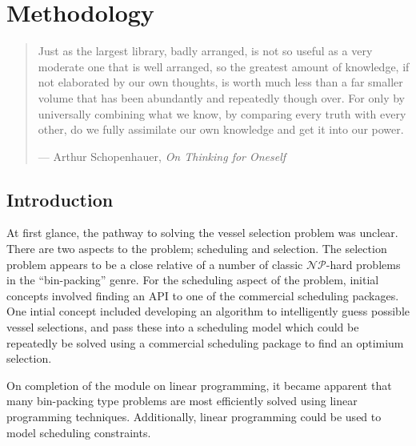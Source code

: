 %
%
%
%

\chapter{Methodology}\label{C.methodology}

\begin{quote}
Just as the largest library, badly arranged, is not so useful as a very moderate
one that is well arranged, so the greatest amount of knowledge, if not
elaborated by our own thoughts, is worth much less than a far smaller volume
that has been abundantly and repeatedly though over.  For only by universally
combining what we know, by comparing every truth with every other, do we fully
assimilate our own knowledge and get it into our power.

\hspace{2cm}--- Arthur Schopenhauer, \emph{On Thinking for Oneself}
\end{quote}

\section{Introduction}\label{S.intro4}

At first glance, the pathway to solving the vessel selection problem was
unclear.
There are two aspects to the problem; scheduling and selection.  
The selection problem appears to be a close relative of a number of classic 
$\mathcal{NP}$-hard problems in the ``bin-packing'' genre.  
For the scheduling aspect of the problem, initial concepts involved finding an
API to one of the commercial scheduling packages.
One intial concept included developing an algorithm to intelligently guess
possible vessel selections, and pass these into a scheduling model which 
could be repeatedly be solved using a commercial scheduling package
to find an optimium selection.

On completion of the module on linear programming, it became apparent that
many bin-packing type problems are most efficiently solved using linear
programming techniques.
Additionally, linear programming could be used to model scheduling constraints.

